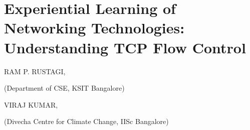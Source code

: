 \chapter{Experiential Learning of Networking Technologies: Understanding TCP Flow Control}

\begin{center}
{\large\uppercase{Ram P. Rustagi}}, 

(Department of CSE, KSIT Bangalore) 

\vskip -6pt

\bigskip
{\large\uppercase{Viraj Kumar,}} 

(Divecha Centre for Climate Change, IISc Bangalore)

\end{center}

\newpage

